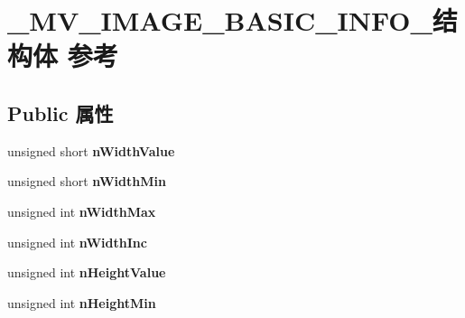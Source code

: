 \hypertarget{struct___m_v___i_m_a_g_e___b_a_s_i_c___i_n_f_o__}{}\section{\+\_\+\+M\+V\+\_\+\+I\+M\+A\+G\+E\+\_\+\+B\+A\+S\+I\+C\+\_\+\+I\+N\+F\+O\+\_\+结构体 参考}
\label{struct___m_v___i_m_a_g_e___b_a_s_i_c___i_n_f_o__}
\subsection*{Public 属性}
\begin{DoxyCompactItemize}
\item 
\mbox{\label{struct___m_v___i_m_a_g_e___b_a_s_i_c___i_n_f_o___ad9a54eb848020b9ed92a2a90ba6eb145}} 
unsigned short {\bfseries n\+Width\+Value}
\item 
\mbox{\label{struct___m_v___i_m_a_g_e___b_a_s_i_c___i_n_f_o___a98c4b3d1dc070c8f303ec9e7662ef73f}} 
unsigned short {\bfseries n\+Width\+Min}
\item 
\mbox{\label{struct___m_v___i_m_a_g_e___b_a_s_i_c___i_n_f_o___a2d30ccc2be994d89a1c459a64495f30c}} 
unsigned int {\bfseries n\+Width\+Max}
\item 
\mbox{\label{struct___m_v___i_m_a_g_e___b_a_s_i_c___i_n_f_o___a0cb11e02b6d9e8b5f816b189ace6449e}} 
unsigned int {\bfseries n\+Width\+Inc}
\item 
\mbox{\label{struct___m_v___i_m_a_g_e___b_a_s_i_c___i_n_f_o___abab23adffb1e02282d45f7059e7d53de}} 
unsigned int {\bfseries n\+Height\+Value}
\item 
\mbox{\label{struct___m_v___i_m_a_g_e___b_a_s_i_c___i_n_f_o___a7a9b6a95b17e826818d298d337ba1599}} 
unsigned int {\bfseries n\+Height\+Min}
\item 
\mbox{\label{struct___m_v___i_m_a_g_e___b_a_s_i_c___i_n_f_o___af58b743ad054155663180e352ece0167}} 

\end{DoxyCompactItemize}
